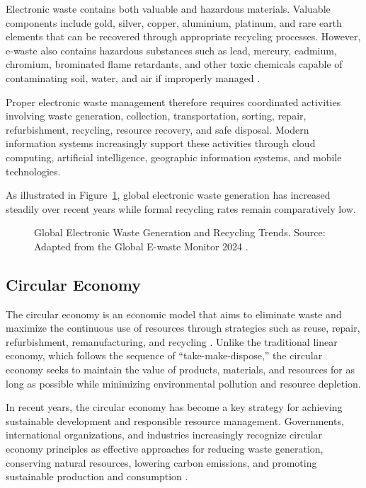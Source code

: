 Electronic waste contains both valuable and hazardous materials. Valuable
components include gold, silver, copper, aluminium, platinum, and rare earth
elements that can be recovered through appropriate recycling processes. However,
e-waste also contains hazardous substances such as lead, mercury, cadmium,
chromium, brominated flame retardants, and other toxic chemicals capable of
contaminating soil, water, and air if improperly managed \citep{who2021}.

Proper electronic waste management therefore requires coordinated activities
involving waste generation, collection, transportation, sorting, repair,
refurbishment, recycling, resource recovery, and safe disposal. Modern information
systems increasingly support these activities through cloud computing, artificial
intelligence, geographic information systems, and mobile technologies.

As illustrated in Figure~\ref{fig:ewaste-trends}, global electronic waste generation
has increased steadily over recent years while formal recycling rates remain
comparatively low.

\begin{figure}[H]
  \centering
  \caption{Global Electronic Waste Generation and Recycling Trends. Source: Adapted from the Global E-waste Monitor 2024 \citep{forti2024}.}
  \label{fig:ewaste-trends}
\end{figure}

\subsection{Circular Economy}

The circular economy is an economic model that aims to eliminate waste and
maximize the continuous use of resources through strategies such as reuse, repair,
refurbishment, remanufacturing, and recycling \citep{geissdoerfer2017,kirchherr2017}.
Unlike the traditional linear economy, which follows the sequence of
``take-make-dispose,'' the circular economy seeks to maintain the value of
products, materials, and resources for as long as possible while minimizing
environmental pollution and resource depletion.

In recent years, the circular economy has become a key strategy for achieving
sustainable development and responsible resource management. Governments,
international organizations, and industries increasingly recognize circular economy
principles as effective approaches for reducing waste generation, conserving
natural resources, lowering carbon emissions, and promoting sustainable
production and consumption \citep{unep2024}.

